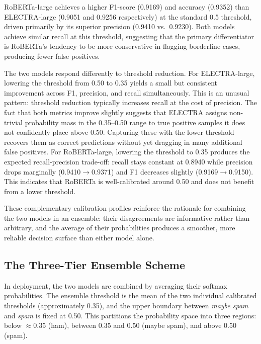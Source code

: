 \acs{RoBERTa}-large achieves a higher F1-score (0.9169) and accuracy (0.9352) than \acs{ELECTRA}-large (0.9051 and 0.9256 respectively) at the standard 0.5 threshold, driven primarily by its superior precision (0.9410 vs.\ 0.9230). Both models achieve similar recall at this threshold, suggesting that the primary differentiator is RoBERTa's tendency to be more conservative in flagging borderline cases, producing fewer false positives.

The two models respond differently to threshold reduction. For \acs{ELECTRA}-large, lowering the threshold from 0.50 to 0.35 yields a small but consistent improvement across F1, precision, and recall simultaneously. This is an unusual pattern: threshold reduction typically increases recall at the cost of precision. The fact that both metrics improve slightly suggests that ELECTRA assigns non-trivial probability mass in the 0.35--0.50 range to true positive samples it does not confidently place above 0.50. Capturing these with the lower threshold recovers them as correct predictions without yet dragging in many additional false positives. For \acs{RoBERTa}-large, lowering the threshold to 0.35 produces the expected recall-precision trade-off: recall stays constant at 0.8940 while precision drops marginally (0.9410$\to$0.9371) and F1 decreases slightly (0.9169$\to$0.9150). This indicates that RoBERTa is well-calibrated around 0.50 and does not benefit from a lower threshold.

These complementary calibration profiles reinforce the rationale for combining the two models in an ensemble: their disagreements are informative rather than arbitrary, and the average of their probabilities produces a smoother, more reliable decision surface than either model alone.

\subsection{The Three-Tier Ensemble Scheme}

In deployment, the two models are combined by averaging their softmax probabilities. The ensemble threshold is the mean of the two individual calibrated thresholds (approximately 0.35), and the upper boundary between \textit{maybe spam} and \textit{spam} is fixed at 0.50. This partitions the probability space into three regions: below $\approx$0.35 (ham), between 0.35 and 0.50 (maybe spam), and above 0.50 (spam).

